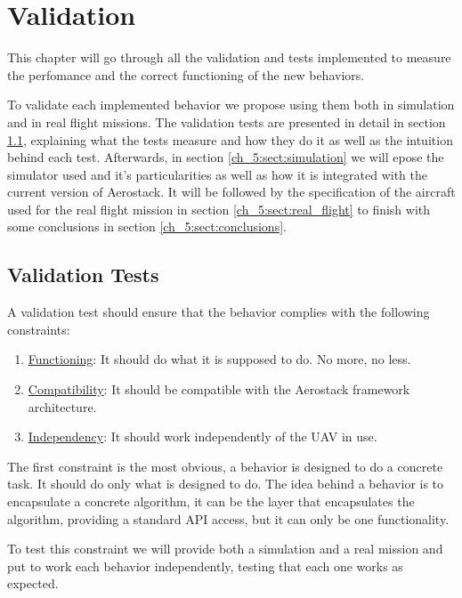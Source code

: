 \chapter{Validation}

  This chapter will go through all the validation and tests implemented to measure the perfomance and the correct functioning of the new behaviors. 

  To validate each implemented behavior we propose using them both in simulation and in real flight missions. The validation tests are presented in detail in section \ref{ch_5:sect:val_tests}, explaining what the tests measure and how they do it as well as the intuition behind each test. Afterwards, in section \ref{ch_5:sect:simulation} we will epose the simulator used and it's particularities as well as how it is integrated with the current version of Aerostack. It will be followed by the specification of the aircraft used for the real flight mission in section \ref{ch_5:sect:real_flight} to finish with some conclusions in section \ref{ch_5:sect:conclusions}.

\section{Validation Tests} \label{ch_5:sect:val_tests}

  A validation test should ensure that the behavior complies with the following constraints:

  \begin{enumerate}
    \item \underline{Functioning}: It should do what it is supposed to do. No more, no less.
    \item \underline{Compatibility}: It should be compatible with the Aerostack framework architecture.
    \item \underline{Independency}: It should work independently of the UAV in use.
  \end{enumerate}

  The first constraint is the most obvious, a behavior is designed to do a concrete task. It should do only what is designed to do. The idea behind a behavior is to encapsulate a concrete algorithm, it can be the layer that encapsulates the algorithm, providing a standard API access, but it can only be one functionality.

  To test this constraint we will provide both a simulation and a real mission and put to work each behavior independently, testing that each one works as expected.

